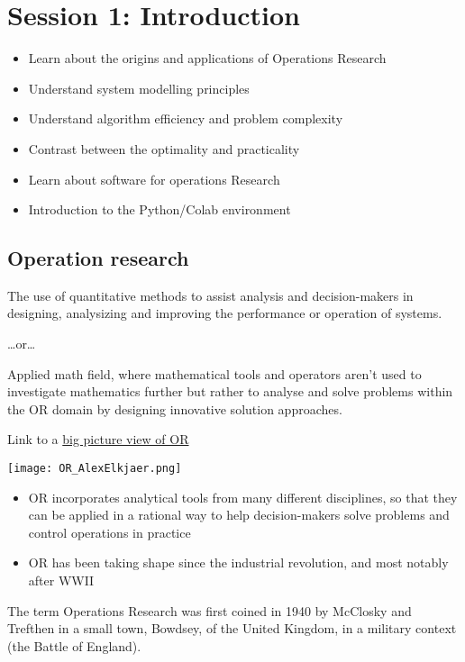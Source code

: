 \section{Session 1: Introduction}

\begin{itemize}
  \item Learn about the origins and applications of Operations Research
  \item Understand system modelling principles
  \item Understand algorithm efficiency and problem complexity
  \item Contrast between the optimality and practicality
  \item Learn about software for operations Research
  \item Introduction to the Python/Colab environment
\end{itemize}



\subsection{Operation research}



The use of quantitative methods to assist analysis and decision-makers in designing, analysizing and improving the performance or operation of systems.

\dots or\dots


Applied math field, where mathematical tools and operators aren’t used to investigate mathematics further but rather to analyse and solve problems within the OR domain by designing innovative solution approaches.

Link to a \href{https://towardsdatascience.com/the-big-picture-of-operations-research-8652d5153aad}{big picture view of OR}


\begin{center}
  \texttt{[image: OR\_AlexElkjaer.png]}
\end{center}

\begin{itemize}
  \item OR incorporates analytical tools from many different disciplines, so that they can be applied in a rational way to help decision-makers solve problems and control operations in practice
  \item OR has been taking shape since the industrial revolution, and most notably after WWII
\end{itemize}
The term Operations Research was first coined in 1940 by McClosky and Trefthen
in a small town, Bowdsey, of the United Kingdom, in a military context (the Battle of England).



